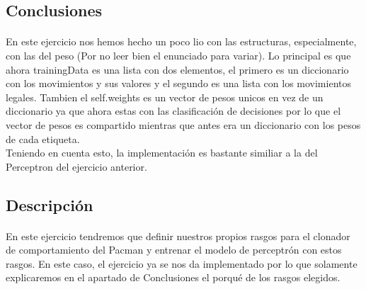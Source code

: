 \documentclass{report}
\begin{document}
      \subsection*{Conclusiones}
        \paragraph*{}{
          En este ejercicio nos hemos hecho un poco lio con las estructuras, especialmente, con las del peso (Por no leer bien el enunciado para variar).
          Lo principal es que ahora trainingData es una lista con dos elementos, el primero es un diccionario con los movimientos y sus valores y el segundo es una lista con los movimientos legales.
          Tambien el self.weights es un vector de pesos unicos en vez de un diccionario ya que ahora estas con las clasificación de decisiones por lo que el vector de pesos es compartido mientras que antes era un diccionario con los pesos de cada etiqueta.\\

          Teniendo en cuenta esto, la implementación es bastante similiar a la del Perceptron del ejercicio anterior.
        }
      \subsection*{Descripción}
        \paragraph*{}{
          En este ejercicio tendremos que definir nuestros propios rasgos para el clonador de comportamiento del Pacman y entrenar el modelo de perceptrón con estos rasgos.
          En este caso, el ejercicio ya se nos da implementado por lo que solamente explicaremos en el apartado de Conclusiones el porqué de los rasgos elegidos.
        }
\end{document}

